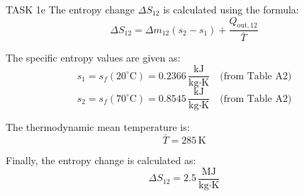 TASK 1e  
The entropy change \( \Delta S_{12} \) is calculated using the formula:  
\[
\Delta S_{12} = \Delta m_{12} (s_2 - s_1) + \frac{Q_{\text{out},12}}{\bar{T}}
\]  

The specific entropy values are given as:  
\[
s_1 = s_f(20^\circ\text{C}) = 0.2366 \, \frac{\text{kJ}}{\text{kg·K}} \quad \text{(from Table A2)}
\]  
\[
s_2 = s_f(70^\circ\text{C}) = 0.8545 \, \frac{\text{kJ}}{\text{kg·K}} \quad \text{(from Table A2)}
\]  

The thermodynamic mean temperature is:  
\[
\bar{T} = 285 \, \text{K}
\]  

Finally, the entropy change is calculated as:  
\[
\Delta S_{12} = 2.5 \, \frac{\text{MJ}}{\text{kg·K}}
\]